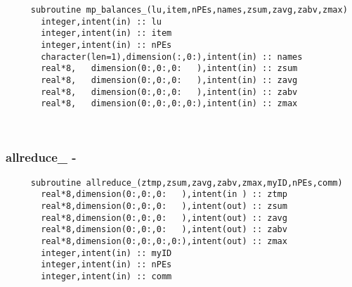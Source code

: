 \begin{verbatim} 
     subroutine mp_balances_(lu,item,nPEs,names,zsum,zavg,zabv,zmax)
       integer,intent(in) :: lu
       integer,intent(in) :: item
       integer,intent(in) :: nPEs
       character(len=1),dimension(:,0:),intent(in) :: names
       real*8,   dimension(0:,0:,0:   ),intent(in) :: zsum
       real*8,   dimension(0:,0:,0:   ),intent(in) :: zavg
       real*8,   dimension(0:,0:,0:   ),intent(in) :: zabv
       real*8,   dimension(0:,0:,0:,0:),intent(in) :: zmax
\end{verbatim}
 
 
\mbox{}\hrulefill\ 
 
  \subsubsection{allreduce\_ -}

\begin{verbatim} 
     subroutine allreduce_(ztmp,zsum,zavg,zabv,zmax,myID,nPEs,comm)
       real*8,dimension(0:,0:,0:   ),intent(in ) :: ztmp
       real*8,dimension(0:,0:,0:   ),intent(out) :: zsum
       real*8,dimension(0:,0:,0:   ),intent(out) :: zavg
       real*8,dimension(0:,0:,0:   ),intent(out) :: zabv
       real*8,dimension(0:,0:,0:,0:),intent(out) :: zmax
       integer,intent(in) :: myID
       integer,intent(in) :: nPEs
       integer,intent(in) :: comm
 \end{verbatim}

